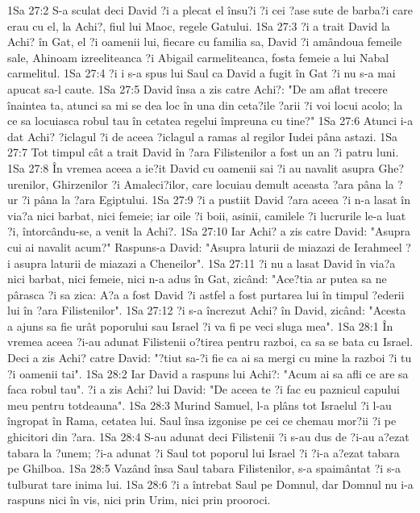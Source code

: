 1Sa 27:2  S-a sculat deci David ?i a plecat el însu?i ?i cei ?ase sute de barba?i care erau cu el, la Achi?, fiul lui Maoc, regele Gatului.
1Sa 27:3  ?i a trait David la Achi? în Gat, el ?i oamenii lui, fiecare cu familia sa, David ?i amândoua femeile sale, Ahinoam izreeliteanca ?i Abigail carmeliteanca, fosta femeie a lui Nabal carmelitul.
1Sa 27:4  ?i i s-a spus lui Saul ca David a fugit în Gat ?i nu s-a mai apucat sa-l caute.
1Sa 27:5  David însa a zis catre Achi?: "De am aflat trecere înaintea ta, atunci sa mi se dea loc în una din ceta?ile ?arii ?i voi locui acolo; la ce sa locuiasca robul tau în cetatea regelui împreuna cu tine?"
1Sa 27:6  Atunci i-a dat Achi? ?iclagul ?i de aceea ?iclagul a ramas al regilor Iudei pâna astazi.
1Sa 27:7  Tot timpul cât a trait David în ?ara Filistenilor a fost un an ?i patru luni.
1Sa 27:8  În vremea aceea a ie?it David cu oamenii sai ?i au navalit asupra Ghe?urenilor, Ghirzenilor ?i Amaleci?ilor, care locuiau demult aceasta ?ara pâna la ?ur ?i pâna la ?ara Egiptului.
1Sa 27:9  ?i a pustiit David ?ara aceea ?i n-a lasat în via?a nici barbat, nici femeie; iar oile ?i boii, asinii, camilele ?i lucrurile le-a luat ?i, întorcându-se, a venit la Achi?.
1Sa 27:10  Iar Achi? a zis catre David: "Asupra cui ai navalit acum?" Raspuns-a David: "Asupra laturii de miazazi de Ierahmeel ?i asupra laturii de miazazi a Cheneilor".
1Sa 27:11  ?i nu a lasat David în via?a nici barbat, nici femeie, nici n-a adus în Gat, zicând: "Ace?tia ar putea sa ne pârasca ?i sa zica: A?a a fost David ?i astfel a fost purtarea lui în timpul ?ederii lui în ?ara Filistenilor".
1Sa 27:12  ?i s-a încrezut Achi? în David, zicând: "Acesta a ajuns sa fie urât poporului sau Israel ?i va fi pe veci sluga mea".
1Sa 28:1  În vremea aceea ?i-au adunat Filistenii o?tirea pentru razboi, ca sa se bata cu Israel. Deci a zis Achi? catre David: "?tiut sa-?i fie ca ai sa mergi cu mine la razboi ?i tu ?i oamenii tai".
1Sa 28:2  Iar David a raspuns lui Achi?: "Acum ai sa afli ce are sa faca robul tau". ?i a zis Achi? lui David: "De aceea te ?i fac eu paznicul capului meu pentru totdeauna".
1Sa 28:3  Murind Samuel, l-a plâns tot Israelul ?i l-au îngropat în Rama, cetatea lui. Saul însa izgonise pe cei ce chemau mor?ii ?i pe ghicitori din ?ara.
1Sa 28:4  S-au adunat deci Filistenii ?i s-au dus de ?i-au a?ezat tabara la ?unem; ?i-a adunat ?i Saul tot poporul lui Israel ?i ?i-a a?ezat tabara pe Ghilboa.
1Sa 28:5  Vazând însa Saul tabara Filistenilor, s-a spaimântat ?i s-a tulburat tare inima lui.
1Sa 28:6  ?i a întrebat Saul pe Domnul, dar Domnul nu i-a raspuns nici în vis, nici prin Urim, nici prin prooroci.
